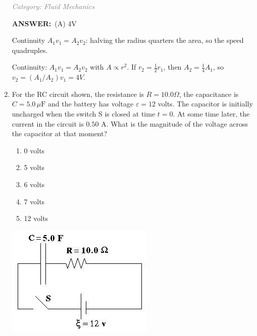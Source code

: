 \documentclass[12pt, a4paper]{article}
\makeatletter
\newcommand{\finalanswer}[1]{\textbf{ANSWER:}~#1}
\newif\if@categoryprinted
\newcommand{\category}[1]{\if@categoryprinted\relax\else\textit{\textcolor{gray}{Category: #1}}\global\@categoryprintedtrue\fi}
\newcommand{\tags}[1]{}
\makeatother
\begin{document}
\begin{CJK*}{UTF8}{gbsn}
\begin{enumerate}[itemsep=1.0em, topsep=0.6em]
\category{Fluid Mechanics} \tags{}
\begin{answerbox}
\finalanswer{(A) 4V}
\end{answerbox}
\begin{insightbox}
Continuity $A_1v_1=A_2v_2$: halving the radius quarters the area, so the speed quadruples.
\end{insightbox}
\begin{solutionbox}

Continuity: $A_1 v_1 = A_2 v_2$ with $A\propto r^2$. If $r_2=\tfrac{1}{2}r_1$, then $A_2=\tfrac{1}{4}A_1$, so $v_2 = (A_1/A_2) v_1 = 4V$.
\end{solutionbox}

\item \label{prob:12}
\noindent\begin{minipage}[t]{0.6\linewidth}
\vspace{0pt}
For the RC circuit shown, the resistance is $R = 10.0 \Omega$, the capacitance is $C = 5.0\,\mu\mathrm{F}$ and the battery has voltage $\varepsilon = 12$ volts. The capacitor is initially uncharged when the switch S is closed at time $t = 0$. At some time later, the current in the circuit is $0.50$ A. What is the magnitude of the voltage across the capacitor at that moment?
\begin{enumerate}[label=(\Alph*)]
    \item 0 volts
    \item 5 volts
    \item 6 volts
    \item 7 volts
    \item 12 volts
\end{enumerate}
\end{minipage}%
\hfill
\begin{minipage}[t]{0.35\linewidth}
\vspace{0pt}
\centering
\includegraphics[width=\linewidth]{Problem_12_Figure.png}
\end{minipage}


\end{enumerate}
\end{CJK*}
\end{document}

